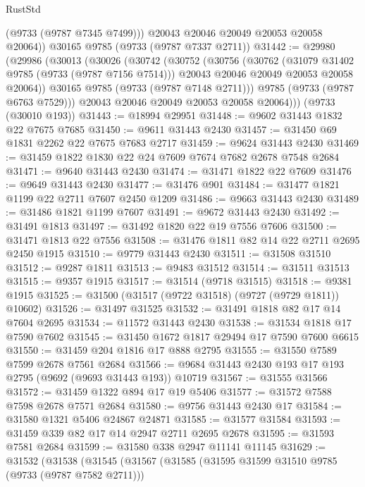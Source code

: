 \begin{lexlean}{RustStd}
\begin{coremodule}
{\begin{coremodule}
{{{{{{{{{{{{{{{{{{{{{{{{{{{{{{{{{{{{{{{{{{{{{{{{{{{{{{{          (@9733 (@9787 @7345 @7499)))
        @20043
        @20046
        @20049
        @20053
        @20058
        @20064))
    @30165
    @9785
    (@9733 (@9787 @7337 @2711))
@31442 := @29980
    (@29986
      (@30013
        (@30026
          (@30742
            (@30752
              (@30756
                (@30762
                  (@31079 @31402 @9785 (@9733 (@9787 @7156 @7514)))
                  @20043
                  @20046
                  @20049
                  @20053
                  @20058
                  @20064))
              @30165
              @9785
              (@9733 (@9787 @7148 @2711)))
            @9785
            (@9733 (@9787 @6763 @7529)))
          @20043
          @20046
          @20049
          @20053
          @20058
          @20064)))
    (@9733 (@30010 @193))
@31443 := @18994 @29951
@31448 := @9602 @31443 @1832 @22 @7675 @7685
@31450 := @9611 @31443 @2430
@31457 := @31450 @69 @1831 @2262 @22 @7675 @7683 @2717
@31459 := @9624 @31443 @2430
@31469 := @31459 @1822 @1830 @22 @24 @7609 @7674 @7682 @2678 @7548 @2684
@31471 := @9640 @31443 @2430
@31474 := @31471 @1822 @22 @7609
@31476 := @9649 @31443 @2430
@31477 := @31476 @901
@31484 := @31477 @1821 @1199 @22 @2711 @7607 @2450 @1209
@31486 := @9663 @31443 @2430
@31489 := @31486 @1821 @1199 @7607
@31491 := @9672 @31443 @2430
@31492 := @31491 @1813
@31497 := @31492 @1820 @22 @19 @7556 @7606
@31500 := @31471 @1813 @22 @7556
@31508 := @31476 @1811 @82 @14 @22 @2711 @2695 @2450 @1915
@31510 := @9779 @31443 @2430
@31511 := @31508 @31510
@31512 := @9287 @1811
@31513 := @9483 @31512
@31514 := @31511 @31513
@31515 := @9357 @1915
@31517 := @31514 (@9718 @31515)
@31518 := @9381 @1915
@31525 := @31500 (@31517 (@9722 @31518) (@9727 (@9729 @1811)) @10602)
@31526 := @31497 @31525
@31532 := @31491 @1818 @82 @17 @14 @7604 @2695
@31534 := @11572 @31443 @2430
@31538 := @31534 @1818 @17 @7590 @7602
@31545 := @31450 @1672 @1817 @29494 @17 @7590 @7600 @6615
@31550 := @31459 @204 @1816 @17 @888 @2795
@31555 := @31550 @7589 @7599 @2678 @7561 @2684
@31566 := @9684 @31443 @2430 @193 @17 @193 @2795 (@9692 (@9693 @31443 @193)) @10719
@31567 := @31555 @31566
@31572 := @31459 @1322 @894 @17 @19 @5406
@31577 := @31572 @7588 @7598 @2678 @7571 @2684
@31580 := @9756 @31443 @2430 @17
@31584 := @31580 @1321 @5406 @24867 @24871
@31585 := @31577 @31584
@31593 := @31459 @339 @82 @17 @14 @2947 @2711 @2695 @2678
@31595 := @31593 @7581 @2684
@31599 := @31580 @338 @2947 @11141 @11145
@31629 := @31532
    (@31538
      (@31545
        (@31567
          (@31585
            (@31595 @31599 @31510 @9785 (@9733 (@9787 @7582 @2711)))
}}}}}}}}}}}}}}}}}}}}}}}}}}}}}}}}}}}}}}}}}}}}}}}}}}}}}}}
\end{coremodule}}
\end{coremodule}
\end{lexlean}
